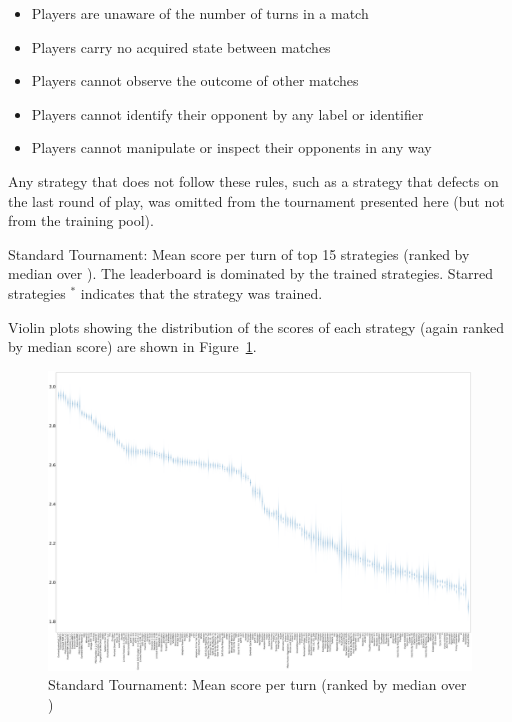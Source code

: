 \documentclass{article}
\begin{document}
\begin{itemize}
  \item Players are unaware of the number of turns in a match
  \item Players carry no acquired state between matches
  \item Players cannot observe the outcome of other matches
  \item Players cannot identify their opponent by any label or identifier
  \item Players cannot manipulate or inspect their opponents in any way
\end{itemize}

Any strategy that does not follow these rules, such as a strategy that defects
on the last round of play, was omitted from the tournament presented here (but
not from the training pool).

\begin{table}[!hbtp]
        \centering
        
        \caption{Standard Tournament: Mean score per turn of top 15 strategies
            (ranked by median over
        \protecttournaments).
        The leaderboard is dominated by the trained strategies. Starred
        strategies $^{*}$
        indicates that the strategy was trained.}
        \label{tbl:standard_score}
\end{table}

Violin plots showing the distribution of the scores of each strategy (again
ranked by median score) are shown in Figure~\ref{fig:standard_boxplot}.

\begin{landscape}
    \begin{figure}[!hbtp]
        \centering
        \includegraphics[width=\paperwidth]{./assets/standard_scores_boxplots.pdf}
        \caption{Standard Tournament: Mean score per turn (ranked by median
        over
        \protecttournaments)}
        \label{fig:standard_boxplot}
    \end{figure}
\end{landscape}
\end{document}
